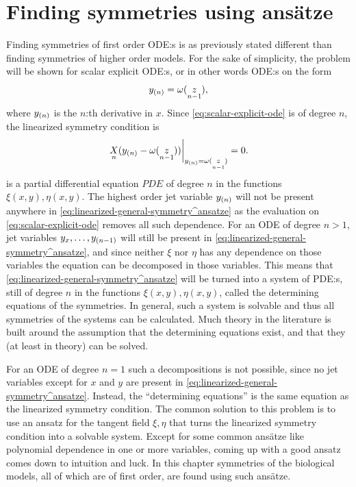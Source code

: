 \chapter{Finding symmetries using ansätze} \label{ch:ansatze}

Finding symmetries of first order ODE:s is as previously stated different than finding symmetries of higher order models.
For the sake of simplicity, the problem will be shown for scalar explicit ODE:s, or in other words ODE:s on the form
\begin{equation} \label{eq:scalar-explicit-ode}
  \prolongpart{y}{n} = \omega(\prolong{z}{n-1}),
\end{equation}
where \(\prolongpart{y}{n}\) is the \(n\):th derivative in \(x\).
Since \cref{eq:scalar-explicit-ode} is of degree \(n\), the linearized symmetry condition is
\begin{equation} \label{eq:linearized-general-symmetry^ansatze}
  \eval{\prolong{X}{n}(\prolongpart{y}{n} - \omega(\prolong{z}{n-1}))}_{\prolongpart{y}{n} = \omega(\prolong{z}{n-1})} = 0.
\end{equation}
 is a partial differential equation \(PDE\) of degree \(n\) in the functions \(\xi(x, y), \eta(x, y)\).
The highest order jet variable \(\prolongpart{y}{n}\) will not be present anywhere in \cref{eq:linearized-general-symmetry^ansatze} as the evaluation on \cref{eq:scalar-explicit-ode} removes all such dependence.
For an ODE of degree \(n > 1\), jet variables \(y_x, \dots, \prolongpart{y}{n-1}\) will still be present in \cref{eq:linearized-general-symmetry^ansatze}, and since neither \(\xi\) nor \(\eta\) has any dependence on those variables the equation can be decomposed in those variables.
This means that \cref{eq:linearized-general-symmetry^ansatze} will be turned into a system of PDE:s, still of degree \(n\) in the functions \(\xi(x, y), \eta(x, y)\), called the determining equations of the symmetries.
In general, such a system is solvable and thus all symmetries of the systems can be calculated.
Much theory in the literature is built around the assumption that the determining equations exist, and that they (at least in theory) can be solved.

For an ODE of degree \(n = 1\) such a decompositions is not possible, since no jet variables except for \(x\) and \(y\) are present in \cref{eq:linearized-general-symmetry^ansatze}.
Instead, the \enquote{determining equations} is the same equation as the linearized symmetry condition.
The common solution to this problem is to use an ansatz for the tangent field \(\xi, \eta\) that turns the linearized symmetry condition into a solvable system.
Except for some common ansätze like polynomial dependence in one or more variables, coming up with a good ansatz comes down to intuition and luck.
In this chapter symmetries of the biological models, all of which are of first order, are found using such ansätze.

